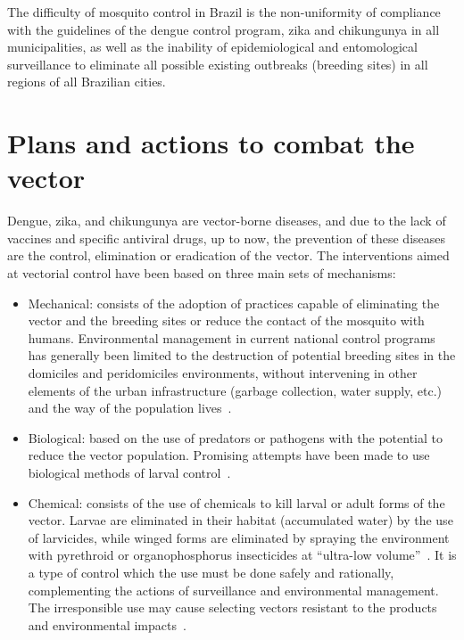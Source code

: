 The difficulty of mosquito control in Brazil is the non-uniformity of compliance with the guidelines of the dengue control program, zika and chikungunya in all municipalities, as well as the inability of epidemiological and entomological surveillance to eliminate all possible existing outbreaks (breeding sites) in all regions of all Brazilian cities.

\section{Plans and actions to combat the vector}
%
Dengue, zika, and chikungunya are vector-borne diseases, and due to the lack of vaccines and specific antiviral drugs, up to now, the prevention of these diseases are the control, elimination or eradication of the vector.
%
%
The interventions aimed at vectorial control have been based on three main sets of mechanisms:
\begin{itemize}
	\item Mechanical: consists of the adoption of practices capable of eliminating the vector and the breeding sites or reduce the contact of the mosquito with humans.
	Environmental management in current national control programs has generally been limited to the destruction of potential breeding sites in the domiciles and peridomiciles environments, without intervening in other elements of the urban infrastructure (garbage collection, water supply, etc.) and the way of the population lives~\cite{araujo2015aedes}.
	\item Biological: based on the use of predators or pathogens with the potential to reduce the vector population.
	Promising attempts have been made to use biological methods of larval control~\cite{araujo2015aedes}.
	\item Chemical: consists of the use of chemicals to kill larval or adult forms of the vector.
	Larvae are eliminated in their habitat (accumulated water) by the use of larvicides, while winged forms are eliminated by spraying the environment with pyrethroid or organophosphorus insecticides at “ultra-low volume”~\cite{araujo2015aedes}.
	It is a type of control which the use must be done safely and rationally, complementing the actions of surveillance and environmental management.
	The irresponsible use may cause selecting vectors resistant to the products and environmental impacts~\cite{world1996chemicals}.
\end{itemize}
%

